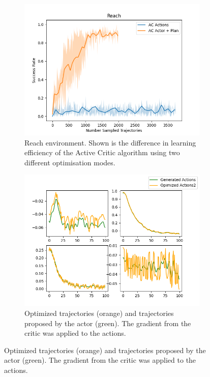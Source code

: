 \begin{figure}[htbp]
    \centering
    \begin{subfigure}[t]{0.65\textwidth}
      \includegraphics[width=\textwidth]{images/Plan_vs_Actions/Reach.png}
      \caption{Reach environment. Shown is the difference in learning efficiency of the Active Critic algorithm using two different optimisation modes.}
      \label{fig:plot1}
    \end{subfigure}
    \medskip
    \begin{subfigure}[t]{0.45\textwidth}
      \includegraphics[width=\textwidth]{images/Plan_vs_Actions/changes/actions_1.png}
      \caption{Optimized trajectories (orange) and trajectories proposed by the actor (green). The gradient from the critic was applied to the actions.}

\end{subfigure}
\end{figure}
